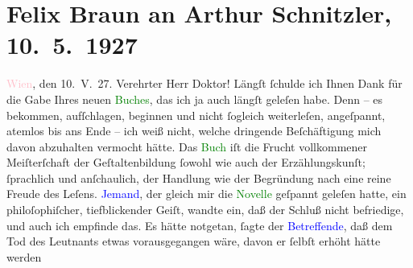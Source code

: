 

               \section[Felix Braun an Arthur Schnitzler, 10. 5. 1927]{ Felix Braun an Arthur Schnitzler, 10. 5. 1927}\nopagebreak{}\rehead{ }\normalsize\beginnumbering{} \toendnotes[C]{\smallbreak\pagebreak[2]} 
\toendnotes[C]{\smallbreak}\pstart
           \centering{}{\pb}\textcolor{pink}{Wien}{}\ledrightnote{\textcolor{pink}{Wien}}, den 10. V. 27.\pend
           \pstart{}Verehrter Herr Doktor!\pend\pstart
           Längſt ſchulde ich Ihnen Dank für die Gabe Ihres neuen \textcolor{green}{Buches}{}, das ich ja auch längſt geleſen
                    habe. Denn – es bekommen, aufſchlagen, beginnen und nicht ſogleich weiterleſen,
                    angeſpannt, atemlos bis ans Ende – ich weiß nicht, welche dringende
                    Beſchäftigung mich davon abzuhalten vermocht hätte. Das \textcolor{green}{Buch}{} iſt die Frucht vollkommener
                    Meiſterſchaft der Geſtaltenbildung ſowohl wie auch der Erzählungskunſt;
                    ſprachlich und anſchaulich, der Hand{\pb}lung wie der
                    Begründung nach eine reine Freude des Leſens.\pend
           \pstart
           \textcolor{blue}{Jemand}{}, der gleich mir die
                        \textcolor{green}{Novelle}{} geſpannt geleſen
                    hatte, ein philoſophiſcher, tiefblickender Geiſt, wandte ein, daß der Schluß
                    nicht befriedige, und auch ich empfinde das. Es hätte notgetan, ſagte der \textcolor{blue}{Betreffende}{}, daß dem Tod
                    des Leutnants etwas vorausgegangen wäre, davon er ſelbſt erhöht hätte werden
